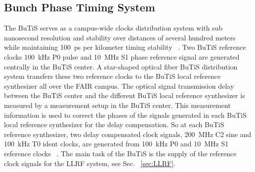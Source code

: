 \subsection{Bunch Phase Timing System}
The BuTiS serves as a campus-wide clocks distribution system with sub nanosecond resolution and stability over distances of several hundred meters while maintaining \SI{100}{ps} per kilometer timing stability ~\cite{moritz_butisdevelopment_2006}. Two BuTiS reference clocks \SI{100}{kHz} P0 pulse and \SI{10}{MHz} S1 phase reference signal are generated centrally in the BuTiS center. A star-shaped optical fiber BuTiS distribution system transfers these two reference clocks to the BuTiS local reference synthesizer all over the FAIR campus. The optical signal transmission delay between the BuTiS center and the different BuTiS local reference synthesizer is measured by a measurement setup in the BuTiS center. This measurement information is used to correct the phases of the signals generated in each BuTiS local reference synthesizer for the delay compensation. So at each BuTiS reference synthesizer, two delay compensated clock signals, \SI{200}{MHz} C2 sine and \SI{100}{kHz} T0 ident clocks, are generated from \SI{100}{kHz} P0 and \SI{10}{MHz} S1 reference clocks ~\cite{moritz_butisdevelopment_2006, zipfel_recent_2011}. The main task of the BuTiS is the supply of the reference clock signals for the LLRF system, see Sec. ~\ref{sec:LLRF}.

